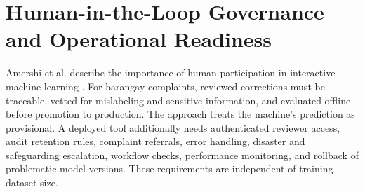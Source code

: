 \section{Human-in-the-Loop Governance and Operational Readiness}
Amershi et al. describe the importance of human participation in interactive machine learning \cite{amershi}. For barangay complaints, reviewed corrections must be traceable, vetted for mislabeling and sensitive information, and evaluated offline before promotion to production. The approach treats the machine's prediction as provisional. A deployed tool additionally needs authenticated reviewer access, audit retention rules, complaint referrals, error handling, disaster and safeguarding escalation, workflow checks, performance monitoring, and rollback of problematic model versions. These requirements are independent of training dataset size.

